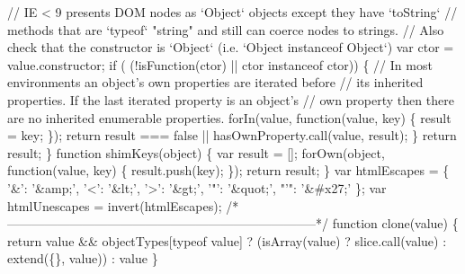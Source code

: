 \begin{DoxyCodeInclude}
{{\textcolor{stringliteral}{    // IE < 9 presents DOM nodes as `Object` objects except they have `toString`}
\textcolor{stringliteral}{    // methods that are `typeof` "}\textcolor{keywordtype}{string}\textcolor{stringliteral}{" and still can coerce nodes to strings.}
\textcolor{stringliteral}{    // Also check that the constructor is `Object` (i.e. `Object instanceof Object`)}
\textcolor{stringliteral}{    var ctor = value.constructor;}
\textcolor{stringliteral}{    if (}
\textcolor{stringliteral}{        (!isFunction(ctor) || ctor instanceof ctor)) \{}
\textcolor{stringliteral}{      // In most environments an object's own properties are iterated before}
\textcolor{stringliteral}{      // its inherited properties. If the last iterated property is an object's}
\textcolor{stringliteral}{      // own property then there are no inherited enumerable properties.}
\textcolor{stringliteral}{      forIn(value, function(value, key) \{}
\textcolor{stringliteral}{        result = key;}
\textcolor{stringliteral}{      \});}
\textcolor{stringliteral}{      return result === false || hasOwnProperty.call(value, result);}
\textcolor{stringliteral}{    \}}
\textcolor{stringliteral}{    return result;}
\textcolor{stringliteral}{  \}}
\textcolor{stringliteral}{}
\textcolor{stringliteral}{  function shimKeys(object) \{}
\textcolor{stringliteral}{    var result = [];}
\textcolor{stringliteral}{    forOwn(object, function(value, key) \{}
\textcolor{stringliteral}{      result.push(key);}
\textcolor{stringliteral}{    \});}
\textcolor{stringliteral}{    return result;}
\textcolor{stringliteral}{  \}}
\textcolor{stringliteral}{}
\textcolor{stringliteral}{  var htmlEscapes = \{}
\textcolor{stringliteral}{    '&': '&amp;',}
\textcolor{stringliteral}{    '<': '&lt;',}
\textcolor{stringliteral}{    '>': '&gt;',}
\textcolor{stringliteral}{    '"}\textcolor{stringliteral}{': '}&quot;\textcolor{stringliteral}{',}
\textcolor{stringliteral}{    "'}\textcolor{stringliteral}{": '&#x27;'}
\textcolor{stringliteral}{  \};}
\textcolor{stringliteral}{}
\textcolor{stringliteral}{  var htmlUnescapes = invert(htmlEscapes);}
\textcolor{stringliteral}{}
\textcolor{stringliteral}{  /*--------------------------------------------------------------------------*/}
\textcolor{stringliteral}{}
\textcolor{stringliteral}{  function clone(value) \{}
\textcolor{stringliteral}{    return value && objectTypes[typeof value]}
\textcolor{stringliteral}{      ? (isArray(value) ? slice.call(value) : extend(\{\}, value))}
\textcolor{stringliteral}{      : value}
\textcolor{stringliteral}{  \}}
\textcolor{stringliteral}{}
}}
\end{DoxyCodeInclude}
